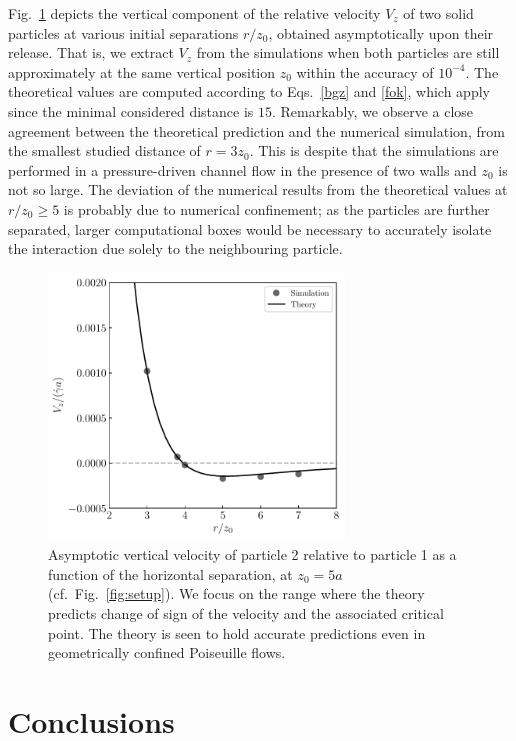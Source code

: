 Fig.\ \ref{fig:vel} depicts the vertical component of the relative velocity $V_z$ of two solid particles at various initial separations $r/z_0$, obtained asymptotically upon their release. That is, we extract $V_z$ from the simulations when both particles are still approximately at the same vertical position $z_0$ within the accuracy of $10^{-4}$. The theoretical values are computed according to Eqs.\ \eqref{bgz} and \eqref{fok}, which apply since the minimal considered distance is $15$.
Remarkably, we observe a close agreement between the theoretical prediction and the numerical simulation, from the smallest studied distance of $r=3z_0$.
This is despite that the simulations are performed in a pressure-driven channel flow in the presence of two walls and $z_0$ is not so large.
The deviation of the numerical results from the theoretical values at $r/z_0 \geq 5$ is probably due to numerical confinement; as the particles are further separated, larger computational boxes would be necessary to accurately isolate the interaction due solely to the neighbouring particle.
\begin{figure}[t]
  \centering
\includegraphics[width=0.7\textwidth]{vel_of_r.pdf}
\caption{Asymptotic vertical velocity of particle 2 relative to particle 1 as a function of the horizontal separation, at $z_0=5a$ (cf.\ Fig.\ \ref{fig:setup}). We focus
 on the range where the theory predicts change of sign of the velocity and the associated critical point. The theory is seen to hold accurate predictions even in geometrically confined Poiseuille flows.}
\label{fig:vel}
\end{figure}

\section{Conclusions}

